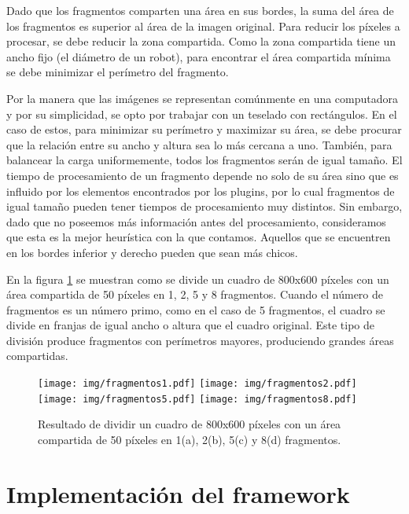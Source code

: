 Dado que los fragmentos comparten una área en sus bordes, la suma del área de
los fragmentos es superior al área de la imagen original. Para reducir los
píxeles a procesar, se debe reducir la zona compartida. Como la zona compartida
tiene un ancho fijo (el diámetro de un robot), para encontrar el área compartida
mínima se debe minimizar el perímetro del fragmento.

Por la manera que las imágenes se representan comúnmente en una computadora y
por su simplicidad, se opto por trabajar con un teselado con rectángulos. En el
caso de estos, para minimizar su perímetro y maximizar su área, se debe procurar
que la relación entre su ancho y altura sea lo más cercana a uno. También, para
balancear la carga uniformemente, todos los fragmentos serán de igual tamaño.
El tiempo de procesamiento de un fragmento depende no solo de su área sino que
es influido por los elementos encontrados por los plugins, por lo cual
fragmentos de igual tamaño pueden tener tiempos de procesamiento muy distintos.
Sin embargo, dado que no poseemos más información antes del procesamiento,
consideramos que esta es la mejor heurística con la que contamos. Aquellos que
se encuentren en los bordes inferior y derecho pueden que sean más chicos.

En la figura \ref{fragmentos} se muestran como se divide un cuadro de 800x600
píxeles con un área compartida de 50 píxeles en 1, 2, 5 y 8 fragmentos. Cuando
el número de fragmentos es un número primo, como en el caso de 5 fragmentos, el
cuadro se divide en franjas de igual ancho o altura que el cuadro original. Este
tipo de división produce fragmentos con perímetros mayores, produciendo grandes
áreas compartidas.

\begin{figure}[!h]

	\texttt{[image: img/fragmentos1.pdf]}
	\texttt{[image: img/fragmentos2.pdf]}
	\texttt{[image: img/fragmentos5.pdf]}
	\texttt{[image: img/fragmentos8.pdf]}
	\caption{Resultado de dividir un cuadro de 800x600 píxeles con un área
	compartida de 50 píxeles en 1(a), 2(b), 5(c) y 8(d) fragmentos.}
	\label{fragmentos}

\end{figure}

\section{Implementación del framework}

